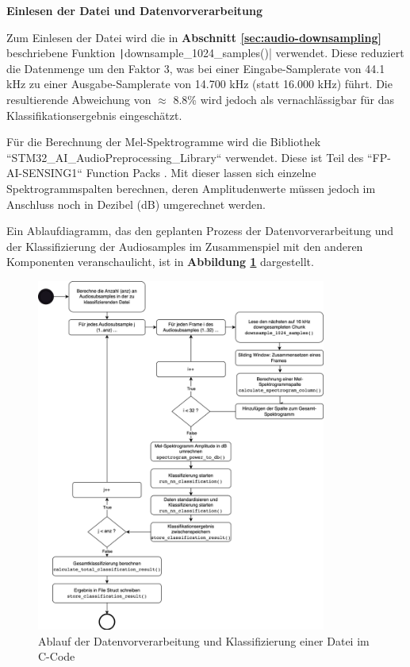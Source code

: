 \textbf{Einlesen der Datei und Datenvorverarbeitung}

Zum Einlesen der Datei wird die in \textbf{Abschnitt \ref{sec:audio-downsampling}} beschriebene Funktion \texttt|downsample_1024_samples()| verwendet. Diese reduziert die Datenmenge um den Faktor 3, was bei einer Eingabe-Samplerate von 44.1 kHz zu einer Ausgabe-Samplerate von 14.700 kHz (statt 16.000 kHz) führt. Die resultierende Abweichung von $\approx$ 8.8\% wird jedoch als vernachlässigbar für das Klassifikationsergebnis eingeschätzt.

Für die Berechnung der Mel-Spektrogramme wird die Bibliothek ``STM32\_AI\_AudioPreprocessing\_Library`` verwendet. Diese ist Teil des ``FP-AI-SENSING1`` Function Packs \cite{fp-ai-sensing1}. Mit dieser lassen sich einzelne Spektrogrammspalten berechnen, deren Amplitudenwerte müssen jedoch im Anschluss noch in Dezibel (dB) umgerechnet werden.

Ein Ablaufdiagramm, das den geplanten Prozess der Datenvorverarbeitung und der Klassifizierung der Audiosamples im Zusammenspiel mit den anderen Komponenten veranschaulicht, ist in \textbf{Abbildung \ref{fig:img-nn-ablaufdiagramm}} dargestellt.

\begin{figure}[h!]
\centering
\includegraphics[width=0.85\textwidth]{images/08_durchfuehrung/nn/ablauf_klassifizierung_c.png}
\caption{Ablauf der Datenvorverarbeitung und Klassifizierung einer Datei im C-Code}
\label{fig:img-nn-ablaufdiagramm}
\end{figure}

